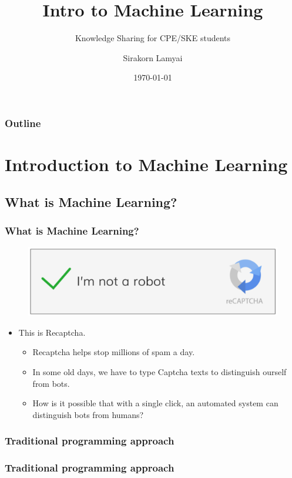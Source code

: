 \documentclass[]{beamer}
\title{Intro to Machine Learning}
\subtitle{Knowledge Sharing for CPE/SKE students}
\author{Sirakorn Lamyai}
\institute{Student, Kasetsart U.}
\date{\today}
\begin{document}
\begin{frame}
	\titlepage
\end{frame}

\begin{frame}
	\frametitle{Outline}
	\tableofcontents
\end{frame}

\section{Introduction to Machine Learning}

\subsection{What is Machine Learning?}

\begin{frame}
	\frametitle{What is Machine Learning?}
	\pause
	\begin{figure}
		\includegraphics[scale=0.4]{imgs/recaptcha.png}
	\end{figure}
	\begin{itemize}
		\pause
		\item This is Recaptcha.
		      \begin{itemize}
			      \pause
			      \item Recaptcha helps stop millions of spam a day.
			            \pause
			      \item In some old days, we have to type Captcha texts to distinguish ourself from bots.
			            \pause
			      \item How is it possible that with a single click, an automated system can distinguish bots from humans?
		      \end{itemize}
	\end{itemize}
\end{frame}

\subsubsection{Traditional programming approach}

\begin{frame}
	\frametitle{Traditional programming approach}
	\begin{center}
	\end{center}
\end{frame}
\end{document}
